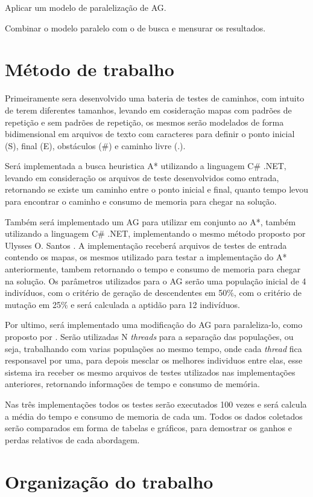Aplicar um modelo de paralelização de AG. 

Combinar o modelo paralelo com o de busca e mensurar os resultados.


\section{Método de trabalho}

Primeiramente sera desenvolvido uma bateria de testes de caminhos, com intuito de terem diferentes tamanhos, levando em cosideração mapas com padrões de repetição e sem padrões de repetição, os mesmos serão modelados de forma bidimensional em arquivos de texto com caracteres para definir o ponto inicial (S), final (E), obstáculos (\#) e caminho livre (.).

Será implementada a busca heuristica A* utilizando a linguagem C\# .NET, levando em consideração os arquivos de teste desenvolvidos como entrada, retornando se existe um caminho entre o ponto inicial e final, quanto tempo levou para encontrar o caminho e consumo de memoria para chegar na solução. 

Também será implementado um AG para utilizar em conjunto ao A*, também utilizando a linguagem C\# .NET, implementando o mesmo método proposto por Ulysses O. Santos \cite{Ulysses}. A implementação receberá  arquivos de testes de entrada contendo os mapas, os mesmos  utilizado para testar a implementação do A* anteriormente, tambem retornando o tempo e consumo de memoria para chegar na solução.
Os parâmetros utilizados para o AG serão uma população inicial de 4 indivíduos, com o critério de geração de descendentes em 50\%, com o critério de mutação em 25\% e será calculada a aptidão para 12 indivíduos.

Por ultimo, será implementado uma modificação do AG para paraleliza-lo, como proposto por \cite{Alaoui}. Serão utilizadas N \textit{threads} para a separação das populações, ou seja, trabalhando com varias populações ao mesmo tempo, onde cada \textit{thread} fica responsavel por uma, para depois mesclar os melhores individuos entre elas, esse sistema ira receber os mesmo arquivos de testes utilizados nas implementações anteriores, retornando informações de tempo e consumo de memória.

Nas três implementações todos os testes serão executados 100 vezes e será calcula a média do tempo e consumo de memoria de cada um. Todos os dados coletados serão comparados em forma de tabelas e gráficos, para demostrar os ganhos e perdas relativos de cada abordagem.




\section{Organização do trabalho}


